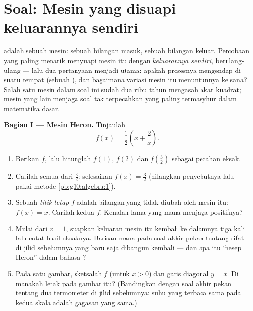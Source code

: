 \section{Soal: Mesin yang disuapi keluarannya sendiri}

\begin{problem}
\label{pb:g10:functions:1}
 adalah sebuah mesin: sebuah bilangan masuk, sebuah bilangan keluar.
Percobaan yang paling menarik menyuapi mesin itu dengan \emph{keluarannya
sendiri}, berulang-ulang --- lalu dua pertanyaan menjadi utama:
apakah prosesnya mengendap di suatu tempat (sebuah \emph{}), dan
bagaimana variasi mesin itu menuntunnya ke sana? Salah satu mesin dalam
soal ini sudah dua ribu tahun mengasah akar kuadrat; mesin yang lain menjaga
soal tak terpecahkan yang paling termasyhur dalam matematika dasar.

\medskip
\noindent\textbf{Bagian I --- Mesin Heron.}
Tinjaulah 
\[
f(x) = \frac12\left(x + \frac2x\right).
\]
\begin{enumerate}
  \item Berikan  $f$, lalu hitunglah $f(1)$, $f(2)$ dan
        $f\!\left(\frac32\right)$ sebagai pecahan eksak.
  \item Carilah semua  dari $\frac32$: selesaikan
        $f(x) = \frac32$ (hilangkan penyebutnya lalu pakai
        metode \cref{pb:g10:algebra:1}).
  \item Sebuah \emph{titik tetap} $f$ adalah
        bilangan yang tidak diubah oleh mesin itu: $f(x) = x$. Carilah kedua
         $f$. Kenalan lama yang mana menjaga
         positifnya?
  \item Mulai dari $x = 1$, suapkan keluaran mesin itu kembali ke dalamnya
        tiga kali lalu catat hasil eksaknya. Barisan mana pada
        soal akhir pekan tentang sifat  di jilid sebelumnya yang baru
        saja dibangun kembali --- dan apa itu ``resep Heron'' dalam bahasa ?
  \item Pada satu gambar, sketsalah  $f$ (untuk $x > 0$)
        dan garis diagonal $y = x$. Di manakah letak  pada gambar itu? (Bandingkan dengan
        soal akhir pekan tentang dua termometer di jilid sebelumnya: suhu yang
        terbaca sama pada kedua skala adalah gagasan yang sama.)
\end{enumerate}


\end{problem}
